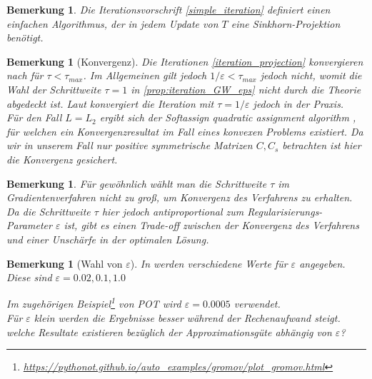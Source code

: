 \documentclass[11pt,a4paper]{article}
\newtheorem{remark}[theorem]{Bemerkung}
\numberwithin{equation}{section}
\begin{document}
	\begin{remark}
		Die Iterationsvorschrift \ref{simple_iteration} definiert einen einfachen Algorithmus, der in jedem Update von $T$ eine Sinkhorn-Projektion benötigt.
	\end{remark}
	
	\begin{remark}[Konvergenz]
		Die Iterationen \autoref{iteration_projection} konvergieren nach \cite{boct2016inertial} für $\tau < \tau_{max}$. Im Allgemeinen gilt jedoch $1/\varepsilon < \tau_{max}$ jedoch nicht, womit die Wahl der Schrittweite $\tau = 1 $ in \autoref{prop:iteration_GW_eps} nicht durch die Theorie abgedeckt ist. Laut \cite{gwd_averaging_kernels} konvergiert die Iteration mit $\tau = 1/\varepsilon$ jedoch in der Praxis.\\
		Für den Fall $L=L_2$ ergibt sich der \glqq \textit{Softassign quadratic assignment algorithm} \glqq{} \cite{rangarajan1999convergence}, für welchen ein Konvergenzresultat im Fall eines konvexen Problems existiert. Da wir in unserem Fall nur positive symmetrische Matrizen $C,C_s$ betrachten ist hier die Konvergenz gesichert.
	\end{remark}
	
	
	
	\begin{remark}
		Für gewöhnlich wählt man die Schrittweite $ \tau$ im Gradientenverfahren nicht zu groß, um Konvergenz des Verfahrens zu erhalten. Da die Schrittweite $\tau$ hier jedoch antiproportional zum Regularisierungs-Parameter $\varepsilon$ ist, gibt es einen Trade-off zwischen der Konvergenz des Verfahrens und einer Unschärfe in der optimalen Lösung. 
	\end{remark}
	
	\begin{remark}[Wahl von $\varepsilon$]
		In \cite{cuturi2013sinkhorn} werden verschiedene Werte für $\varepsilon$ angegeben. Diese sind $\varepsilon = 0.02, 0.1, 1.0$
		
		Im zugehörigen Beispiel\footnote{\url{https://pythonot.github.io/auto_examples/gromov/plot_gromov.html}} von POT wird $\varepsilon = 0.0005$ verwendet. \\
		Für $\varepsilon$ klein werden die Ergebnisse besser während der Rechenaufwand steigt.\\
		welche Resultate existieren bezüglich der Approximationsgüte abhängig von $\varepsilon$?
	\end{remark}
\end{document}

